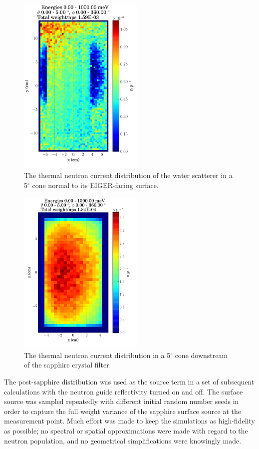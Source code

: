 \documentclass[a4paper,
              ]{jacow}
\begin{document}
\begin{figure}[!htb]
   \centering
   \includegraphics*[trim = 0mm 8mm 0mm 1.5mm, width=60mm]{graphics/wsdist.pdf}
   \caption{The thermal neutron current distribution of the water scatterer in a 5$^\circ$ cone normal to its EIGER-facing surface.}
   \label{wsdist}
\end{figure}

\begin{figure}[!htb]
   \centering
   \includegraphics*[trim = 0mm 8mm 0mm 2.5mm, width=60mm]{graphics/sappdist.pdf}
   \caption{The thermal neutron current distribution in a 5$^\circ$ cone downstream of the sapphire crystal filter.}
   \label{sappdist}
\end{figure}

The post-sapphire distribution was used as the source term in a set of subsequent calculations with the neutron guide reflectivity turned on and off.  The surface source was sampled repeatedly with different initial random number seeds in order to capture the full weight variance of the sapphire surface source at the measurement point.  Much effort was made to keep the simulations as high-fidelity as possible; no spectral or spatial approximations were made with regard to the neutron population, and no geometrical simplifications were knowingly made.
\end{document}
